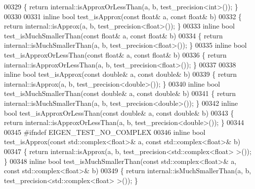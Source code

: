 \begin{DoxyCode}
00329 \{ \textcolor{keywordflow}{return} internal::isApproxOrLessThan(a, b, test\_precision<int>()); \}
00330 
00331 \textcolor{keyword}{inline} \textcolor{keywordtype}{bool} test\_isApprox(\textcolor{keyword}{const} \textcolor{keywordtype}{float}& a, \textcolor{keyword}{const} \textcolor{keywordtype}{float}& b)
00332 \{ \textcolor{keywordflow}{return} internal::isApprox(a, b, test\_precision<float>()); \}
00333 \textcolor{keyword}{inline} \textcolor{keywordtype}{bool} test\_isMuchSmallerThan(\textcolor{keyword}{const} \textcolor{keywordtype}{float}& a, \textcolor{keyword}{const} \textcolor{keywordtype}{float}& b)
00334 \{ \textcolor{keywordflow}{return} internal::isMuchSmallerThan(a, b, test\_precision<float>()); \}
00335 \textcolor{keyword}{inline} \textcolor{keywordtype}{bool} test\_isApproxOrLessThan(\textcolor{keyword}{const} \textcolor{keywordtype}{float}& a, \textcolor{keyword}{const} \textcolor{keywordtype}{float}& b)
00336 \{ \textcolor{keywordflow}{return} internal::isApproxOrLessThan(a, b, test\_precision<float>()); \}
00337 
00338 \textcolor{keyword}{inline} \textcolor{keywordtype}{bool} test\_isApprox(\textcolor{keyword}{const} \textcolor{keywordtype}{double}& a, \textcolor{keyword}{const} \textcolor{keywordtype}{double}& b)
00339 \{ \textcolor{keywordflow}{return} internal::isApprox(a, b, test\_precision<double>()); \}
00340 \textcolor{keyword}{inline} \textcolor{keywordtype}{bool} test\_isMuchSmallerThan(\textcolor{keyword}{const} \textcolor{keywordtype}{double}& a, \textcolor{keyword}{const} \textcolor{keywordtype}{double}& b)
00341 \{ \textcolor{keywordflow}{return} internal::isMuchSmallerThan(a, b, test\_precision<double>()); \}
00342 \textcolor{keyword}{inline} \textcolor{keywordtype}{bool} test\_isApproxOrLessThan(\textcolor{keyword}{const} \textcolor{keywordtype}{double}& a, \textcolor{keyword}{const} \textcolor{keywordtype}{double}& b)
00343 \{ \textcolor{keywordflow}{return} internal::isApproxOrLessThan(a, b, test\_precision<double>()); \}
00344 
00345 \textcolor{preprocessor}{#ifndef EIGEN\_TEST\_NO\_COMPLEX}
00346 \textcolor{keyword}{inline} \textcolor{keywordtype}{bool} test\_isApprox(\textcolor{keyword}{const} std::complex<float>& a, \textcolor{keyword}{const} std::complex<float>& b)
00347 \{ \textcolor{keywordflow}{return} internal::isApprox(a, b, test\_precision<std::complex<float> >()); \}
00348 \textcolor{keyword}{inline} \textcolor{keywordtype}{bool} test\_isMuchSmallerThan(\textcolor{keyword}{const} std::complex<float>& a, \textcolor{keyword}{const} std::complex<float>& b)
00349 \{ \textcolor{keywordflow}{return} internal::isMuchSmallerThan(a, b, test\_precision<std::complex<float> >()); \}

\end{DoxyCode}
